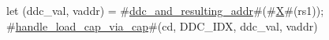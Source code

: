 let (ddc_val, vaddr) = #\hyperref[sailRISCVzddczyandzyresultingzyaddr]{ddc\_and\_resulting\_addr}#(#\hyperref[sailRISCVzX]{X}#(rs1));
#\hyperref[sailRISCVzhandlezyloadzycapzyviazycap]{handle\_load\_cap\_via\_cap}#(cd, DDC_IDX, ddc_val, vaddr)
